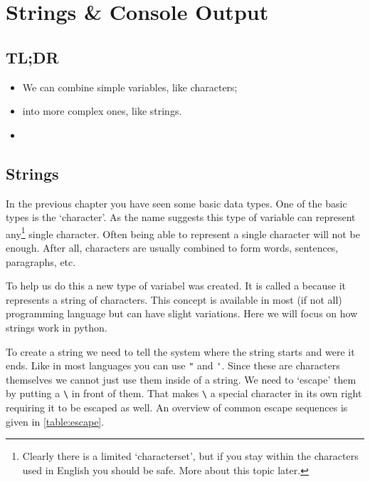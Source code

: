  

\chapter{Strings \& Console Output}

	\section*{TL;DR}
	
	\begin{itemize}
		\item We can combine simple variables, like characters;
		\item into more complex ones, like strings.
		\item 
	\end{itemize}
	\clearpage

	\section{Strings}
	
	In the previous chapter you have seen some basic data types.
	One of the basic types is the `character'.
	As the name suggests this type of variable can represent any\footnote{Clearly there is a limited `characterset', but if you stay within the characters used in English you should be safe. More about this topic later.} single character.
	Often being able to represent a single character will not be enough.
	After all, characters are usually combined to form words, sentences, paragraphs, etc.
	
	To help us do this a new type of variabel was created. 
	It is called a \textbf{} because it represents a string of characters.
	This concept is available in most (if not all) programming language but can have slight variations. 
	Here we will focus on how strings work in python.
	
	To create a string we need to tell the system where the string starts and were it ends. 
	Like in most languages you can use \lstinline|"| and \lstinline|'|.
	Since these are characters themselves we cannot just use them inside of a string.
	We need to `escape' them by putting a \lstinline|\| in front of them.
	That makes \lstinline|\| a special character in its own right requiring it to be escaped as well.
	An overview of common escape sequences is given in \autoref{table:escape}.
	
